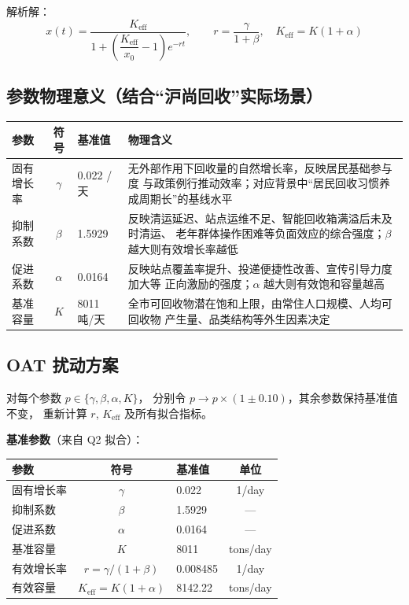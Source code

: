 \documentclass[12pt,a4paper]{article}
\begin{document}
解析解：
\begin{equation}\label{eq:solution}
x(t) = \frac{K_{\text{eff}}}{1 + \left(\dfrac{K_{\text{eff}}}{x_0} - 1\right) e^{-r t}},\qquad
r = \frac{\gamma}{1+\beta},\quad K_{\text{eff}} = K(1+\alpha)
\end{equation}

\subsection{参数物理意义（结合``沪尚回收''实际场景）}

\begin{center}
\begin{tabular}{lclp{7cm}}
\toprule
参数 & 符号 & 基准值 & 物理含义 \\
\midrule
固有增长率 & $\gamma$ & 0.022 /天 &
  无外部作用下回收量的自然增长率，反映居民基础参与度
  与政策例行推动效率；对应背景中``居民回收习惯养成周期长''的基线水平 \\

抑制系数 & $\beta$ & 1.5929 &
  反映清运延迟、站点运维不足、智能回收箱满溢后未及时清运、
  老年群体操作困难等负面效应的综合强度；$\beta$ 越大则有效增长率越低 \\

促进系数 & $\alpha$ & 0.0164 &
  反映站点覆盖率提升、投递便捷性改善、宣传引导力度加大等
  正向激励的强度；$\alpha$ 越大则有效饱和容量越高 \\

基准容量 & $K$ & 8011 吨/天 &
  全市可回收物潜在饱和上限，由常住人口规模、人均可回收物
  产生量、品类结构等外生因素决定 \\
\bottomrule
\end{tabular}
\end{center}

\subsection{OAT 扰动方案}

对每个参数 $p \in \{\gamma, \beta, \alpha, K\}$，
分别令 $p \to p \times (1 \pm 0.10)$，其余参数保持基准值不变，
重新计算 $r$, $K_{\text{eff}}$ 及所有拟合指标。

\textbf{基准参数}（来自 Q2 拟合）：

\begin{center}
\begin{tabular}{lclc}
\toprule
参数 & 符号 & 基准值 & 单位 \\
\midrule
固有增长率 & $\gamma$ & 0.022   & 1/day \\
抑制系数   & $\beta$  & 1.5929  & — \\
促进系数   & $\alpha$ & 0.0164  & — \\
基准容量   & $K$      & 8011    & tons/day \\
\midrule
有效增长率 & $r = \gamma/(1+\beta)$ & 0.008485 & 1/day \\
有效容量   & $K_{\text{eff}} = K(1+\alpha)$ & 8142.22 & tons/day \\
\bottomrule
\end{tabular}
\end{center}
\end{document}
